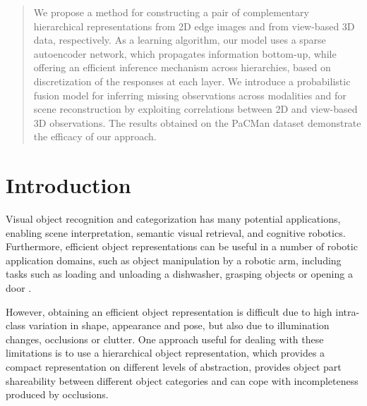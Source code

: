 \documentclass[conference]{IEEEtran}
\begin{document}




\maketitle

\begin{abstract}
We propose a method for constructing a pair of complementary hierarchical representations from 2D edge images and from view-based 3D data, respectively.  As a learning algorithm, our model uses a sparse autoencoder network, which propagates information bottom-up, while offering an efficient inference mechanism across hierarchies, based on discretization of the responses at each layer.  We introduce a probabilistic fusion model for inferring missing observations across modalities and for scene reconstruction by exploiting correlations between 2D and view-based 3D observations. The results obtained on the PaCMan dataset demonstrate the efficacy of our approach.
\end{abstract}


%
\IEEEpeerreviewmaketitle

\section{Introduction}
Visual object recognition and categorization has many potential applications, enabling scene interpretation, semantic visual retrieval, and cognitive robotics. Furthermore, efficient object representations can be useful in a number of robotic application domains, such as object manipulation by a robotic arm, including tasks such as loading and unloading a dishwasher, grasping objects or opening a door \cite{Detry-2013-IROS}. 

However, obtaining an efficient object representation is difficult due to high intra-class variation in shape, appearance and pose, but also due to illumination changes, occlusions or clutter. One approach useful for dealing with these limitations is to use a hierarchical object representation, which provides a compact representation on different levels of abstraction, provides object part shareability between different object categories and can cope with incompleteness produced by occlusions.
\end{document}
